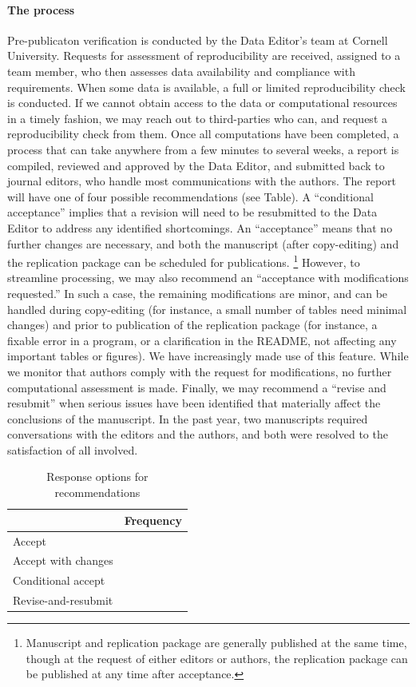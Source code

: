 \documentclass[PP]{AEA}
\begin{document}
\paragraph{The process}

Pre-publicaton verification is conducted by the Data Editor's team at Cornell University. 
Requests for assessment of reproducibility are received, assigned to a team member, who then assesses data availability and compliance with requirements. When some data is available, a full or limited reproducibility check is conducted. If we cannot obtain access to the data or computational resources in a timely fashion, we may reach out to third-parties who can, and request a reproducibility check from them. Once all computations have been completed, a process that can take anywhere from a few minutes to several weeks, a report is compiled, reviewed and approved by the Data Editor, and submitted back to journal editors, who handle most communications with the authors. The report will have  one of four possible recommendations (see Table). A ``conditional acceptance'' implies that a revision will need to be resubmitted to the Data Editor to address any identified shortcomings. An ``acceptance'' means that no further changes are necessary, and both the manuscript (after copy-editing) and the replication package can be scheduled for publications.%
%
\footnote{Manuscript and replication package are generally published at the same time, though at the request of either editors or authors, the replication package can be published at any time after acceptance.} 
%
However, to streamline processing, we may also recommend an ``acceptance with modifications requested.'' In such a case, the remaining modifications are minor, and can be handled during copy-editing (for instance, a small number of tables need minimal changes) and prior to publication of the replication package (for instance, a fixable error in a program, or a clarification in the README, not affecting any important tables or figures). We have increasingly made use of this feature. While we monitor that authors comply with the request for modifications, no further computational assessment is made. Finally, we may recommend a ``revise and resubmit'' when serious issues have been identified that materially affect the conclusions of the manuscript. In the past year, two manuscripts required conversations with the editors and the authors, and both were resolved to the satisfaction of all involved.

\begin{table}[t]
    \caption{Response options for recommendations}
    \label{tab:responses}
    \centering
    \begin{tabular}{lr}
    \toprule
               & Frequency \\
               \midrule
        Accept &  \\
        Accept with changes &\\
        Conditional accept &\\
        Revise-and-resubmit & \\
        \bottomrule
    \end{tabular}
\end{table}
\end{document}
